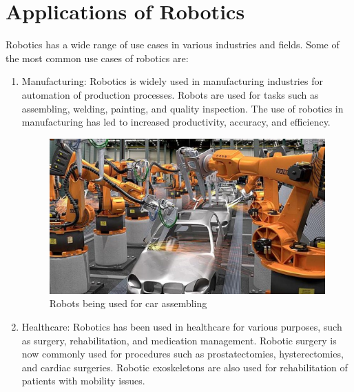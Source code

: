 \section{Applications of Robotics}
Robotics has a wide range of use cases in various industries and fields. Some of the most common use cases of robotics are:
\begin{enumerate}
    \item Manufacturing: Robotics is widely used in manufacturing industries for automation of production processes. Robots are used for tasks such as assembling, welding, painting, and quality inspection. The use of robotics in manufacturing has led to increased productivity, accuracy, and efficiency.

          \begin{figure}[H]
              \centering
              \includegraphics[scale=.225]{images/industral-robos.jpg}
              \caption[Car assembling robots]{Robots being used for car assembling}
          \end{figure}

    \item Healthcare: Robotics has been used in healthcare for various purposes, such as surgery, rehabilitation, and medication management. Robotic surgery is now commonly used for procedures such as prostatectomies, hysterectomies, and cardiac surgeries. Robotic exoskeletons are also used for rehabilitation of patients with mobility issues.


\end{enumerate}
